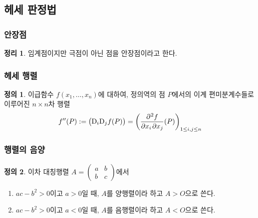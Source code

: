 \documentclass[unfonts,oneside,a4paper]{oblivoir}
\theoremstyle{definition}
\newtheorem{definition}{정의}[subsubsection]
\theoremstyle{theorem}
\newtheorem{theorem}{정리}[subsubsection]
\newcommand{\dD}{\mathrm{D}}
\begin{document}
\subsection{헤세 판정법}
\subsubsection{안장점}

\begin{theorem}
    임계점이지만 극점이 아닌 점을 안장점이라고 한다.
\end{theorem}

\subsubsection{헤세 행렬}

\begin{definition}
    이급함수 $f(x_1, \dots, x_n)$에 대하여, 정의역의 점 $P$에서의 이계 편미분계수들로 이루어진 $n \times n$차 행렬
    \begin{equation*}
        f''(P) := \bigl(\dD_i \dD_j f(P)\bigr) = \left(\diffp{f}{x_i, x_j}(P)\right)_{1 \leq i, j \leq n}
    \end{equation*}
\end{definition}

\subsubsection{행렬의 음양}

\begin{definition}
    이차 대칭행렬 $A = \begin{pmatrix}a & b\\b & c\end{pmatrix}$에서
    \begin{enumerate}
        \item $ac - b^2 > 0$이고 $a > 0$일 때, $A$를 양행렬이라 하고 $A > O$으로 쓴다.
        \item $ac - b^2 > 0$이고 $a < 0$일 때, $A$를 음행렬이라 하고 $A < O$으로 쓴다.
    \end{enumerate}
\end{definition}
\end{document}
